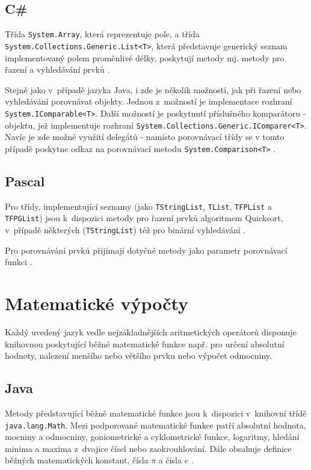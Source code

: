 \documentclass{bakalarka}
\begin{document}
\subsection{C\#}
Třída \texttt{System.Array}, která reprezentuje pole, a třída \texttt{System.Collections\-.Generic.List<T>}, která představuje generický seznam implementovaný polem proměnlivé délky, poskytují metody mj. metody pro řazení a vyhledávání prvků \cite{cs-guide-array, cs-guide-list}.\par
Stejně jako v~případě jazyka Java, i zde je několik možností, jak při řazení nebo vyhledávání porovnávat objekty. Jednou z~možností je implementace rozhraní \texttt{System.IComparable<T>}. Další možností je poskytnutí příslušného komparátoru - objektu, jež implementuje rozhraní \texttt{System.Collections\-.Generic.IComparer<T>}. Navíc je zde možné využití delegátů - namísto porovnávací třídy se v tomto případě poskytne odkaz na porovnávací metodu \texttt{System.Comparison<T>} \cite{cs-guide-icomparable, cs-guide-icomparer, cs-guide-comparison}.

\subsection{Pascal}
Pro třídy, implementující seznamy (jako \texttt{TStringList}, \texttt{TList}, \texttt{TFPList} a \texttt{TFPGList}) jsou k~dispozici metody pro řazení prvků algoritmem Quicksort, v~případě některých (\texttt{TStringList}) též pro binární vyhledávání \cite{pas-guide-tlistsort, pas-guide-tfplistsort}.\par
Pro porovnávání prvků přijímají dotyčné metody jako parametr porovnávací funkci \cite{pas-guide-tlistsortcompare}.

\section{Matematické výpočty}
Každý uvedený jazyk vedle nejzákladnějších aritmetických operátorů disponuje knihovnou poskytující běžné matematické funkce např. pro určení absolutní hodnoty, nalezení menšího nebo většího prvku nebo výpočet odmocniny.

\subsection{Java}
Metody představující běžné matematické funkce jsou k~dispozici v~knihovní třídě \texttt{java.lang.Math}. Mezi podporované matematické funkce patří absolutní hodnota, mocniny a odmocniny, goniometrické a cyklometrické funkce, logaritmy, hledání minima a maxima z~dvojice čísel nebo zaokrouhlování. Dále obsahuje definice běžných matematických konstant, čísla $\pi$ a čísla $e$ \cite{java-guide-math}.
\end{document}
